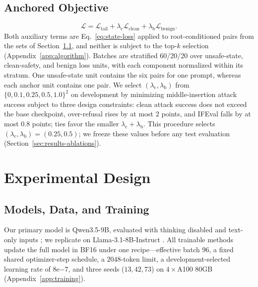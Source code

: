 \documentclass[11pt]{article}
\begin{document}
\subsection{Anchored Objective}
\label{sec:anchored-objective}

\begin{equation}
  \mathcal{L}
  =
  \mathcal{L}_{\mathrm{tail}}
  +\lambda_{\mathrm{c}}\mathcal{L}_{\mathrm{clean}}
  +\lambda_{\mathrm{b}}\mathcal{L}_{\mathrm{benign}}.
  \label{eq:full-loss}
\end{equation}
Both auxiliary terms are Eq.~\eqref{eq:state-loss} applied to root-conditioned
pairs from the sets of Section~\ref{sec:models-data}, and neither is subject to
the top-\(k\) selection (Appendix~\ref{app:algorithm}). Batches are
stratified 60/20/20 over unsafe-state, clean-safety, and benign loss units, with
each component normalized within its stratum. One unsafe-state unit contains
the six pairs for one prompt, whereas each anchor unit contains one pair. We select
\((\lambda_{\mathrm{c}},\lambda_{\mathrm{b}})\) from
\(\{0,0.1,0.25,0.5,1.0\}^2\) on development by minimizing middle-insertion attack
success subject to three design constraints: clean attack success does
not exceed the base checkpoint, over-refusal rises by at most \(2\) points, and
IFEval falls by at most \(0.8\) points; ties favor the smaller
\(\lambda_{\mathrm{c}}+\lambda_{\mathrm{b}}\). This procedure selects
\((\lambda_{\mathrm{c}},\lambda_{\mathrm{b}})=(0.25,0.5)\); we freeze these
values before any test evaluation (Section~\ref{sec:results-ablations}).

\section{Experimental Design}
\label{sec:experiments}

\subsection{Models, Data, and Training}
\label{sec:models-data}

Our primary model is Qwen3.5-9B, evaluated with thinking disabled and text-only
inputs \citep{qwen2026qwen35}; we replicate on Llama-3.1-8B-Instruct
\citep{dubey2024llama3}. All trainable methods update the full model in BF16
under one recipe---effective batch \(96\), a fixed shared optimizer-step
schedule, a \(2048\)-token limit, a development-selected learning rate of
\(8\mathrm{e}{-7}\), and three seeds
(\(13,42,73\)) on \(4\times\)A100 80GB (Appendix~\ref{app:training}).
\end{document}
